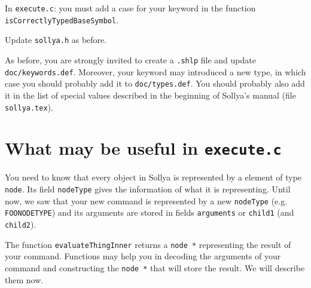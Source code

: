 \documentclass{article}
\newcommand{\commandNodeName}{\texttt{FOONODETYPE}\xspace}
\begin{document}
In \texttt{execute.c}: you must add a case for your keyword in the function \texttt{isCorrectlyTypedBaseSymbol}.

Update \texttt{sollya.h} as before.

As before, you are strongly invited to create a \texttt{.shlp} file and update \texttt{doc/keywords.def}. Moreover, your keyword may introduced a new type, in which case you should probably add it to \texttt{doc/types.def}. You should probably also add it in the list of special values described in the beginning of Sollya's manual (file \texttt{sollya.tex}).


\section{What may be useful in \texttt{execute.c}}
\label{execute}
You need to know that every object in Sollya is represented by a element of type \texttt{node}. Its field \texttt{nodeType} gives the information of what it is representing. Until now, we saw that your new command is represented by a new \texttt{nodeType} (e.g. \commandNodeName) and its arguments are stored in fields \texttt{arguments} or \texttt{child1} (and \texttt{child2}).

The function \texttt{evaluateThingInner} returns a \texttt{node *} representing the result of your command. Functions may help you in decoding the arguments of your command and constructing the \texttt{node *} that will store the result. We will describe them now.
\end{document}
